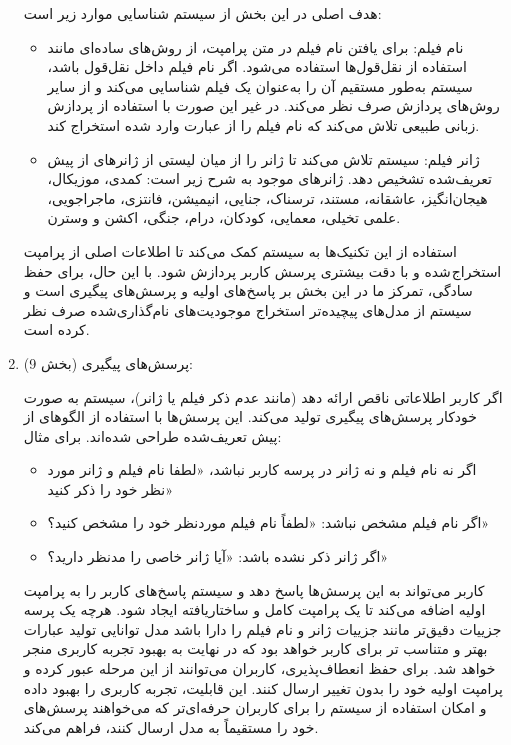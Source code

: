 \begin{enumerate}
\begin{itemize}
\end{itemize}


هدف اصلی در این بخش از سیستم شناسایی موارد زیر است:
\begin{itemize}
\item
نام فیلم: برای یافتن نام فیلم در متن پرامپت، از روش‌های ساده‌ای مانند استفاده از نقل‌قول‌ها استفاده می‌شود. اگر نام فیلم داخل نقل‌قول باشد، سیستم به‌طور مستقیم آن را به‌عنوان یک فیلم شناسایی می‌کند و از سایر روش‌های پردازش صرف نظر می‌کند. در غیر این صورت با استفاده از پردازش زبانی طبیعی تلاش می‌کند که نام فیلم را از عبارت وارد شده استخراج کند.
\item
ژانر فیلم: سیستم تلاش می‌کند تا ژانر را از میان لیستی از ژانرهای از پیش تعریف‌شده تشخیص دهد. ژانرهای موجود به شرح زیر است:
کمدی، موزیکال، هیجان‌انگیز، عاشقانه، مستند، ترسناک، جنایی، انیمیشن، فانتزی، ماجراجویی، علمی تخیلی، معمایی، کودکان، درام، جنگی، اکشن و وسترن.
\end{itemize}

استفاده از این تکنیک‌ها به سیستم کمک می‌کند تا اطلاعات اصلی از پرامپت استخراج شده و با دقت بیشتری پرسش کاربر پردازش شود. با این حال، برای حفظ سادگی، تمرکز ما در این بخش بر پاسخ‌های اولیه و پرسش‌های پیگیری است و سیستم از مدل‌های پیچیده‌تر استخراج موجودیت‌های نام‌گذاری‌شده صرف نظر کرده است.

\item
پرسش‌های پیگیری (بخش 9):

اگر کاربر اطلاعاتی ناقص ارائه دهد (مانند عدم ذکر فیلم یا ژانر)، سیستم به صورت خودکار پرسش‌های پیگیری تولید می‌کند. این پرسش‌ها با استفاده از الگوهای از پیش تعریف‌شده طراحی شده‌اند. برای مثال:
\begin{itemize}
\item
اگر نه نام فیلم و نه ژانر در پرسه کاربر نباشد، «لطفا نام فیلم و ژانر مورد نظر خود را ذکر کنید»
\item
اگر نام فیلم مشخص نباشد: «لطفاً نام فیلم موردنظر خود را مشخص کنید؟»
\item
اگر ژانر ذکر نشده باشد: «آیا ژانر خاصی را مدنظر دارید؟»
\end{itemize}
کاربر می‌تواند به این پرسش‌ها پاسخ دهد و سیستم پاسخ‌های کاربر را به پرامپت اولیه اضافه می‌کند تا یک پرامپت کامل و ساختاریافته ایجاد شود.
\newline
هرچه یک پرسه جزییات دقیق‌تر مانند جزییات ژانر و نام فیلم را دارا باشد مدل توانایی تولید عبارات بهتر و متناسب تر برای کاربر خواهد بود که در نهایت به بهبود تجربه کاربری منجر خواهد شد.
\newline
برای حفظ انعطاف‌پذیری، کاربران می‌توانند از این مرحله عبور کرده و پرامپت اولیه خود را بدون تغییر ارسال کنند. این قابلیت، تجربه کاربری را بهبود  داده و امکان استفاده از سیستم را برای کاربران حرفه‌ای‌تر که می‌خواهند پرسش‌های خود را مستقیماً به مدل ارسال کنند، فراهم می‌کند.


\end{enumerate}
